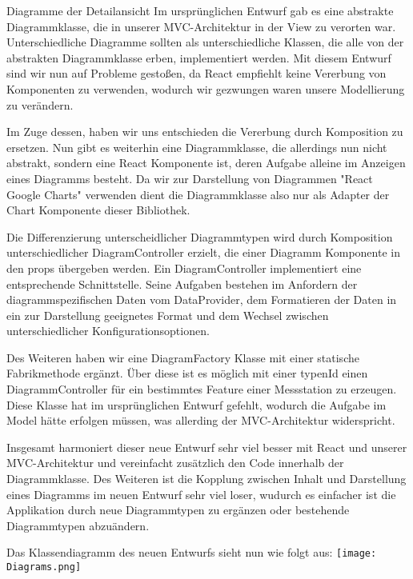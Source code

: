 \begin{Change}{Diagramme der Detailansicht}
    Im ursprünglichen Entwurf gab es eine abstrakte Diagrammklasse, die in unserer MVC-Architektur in der View zu verorten war. Unterschiedliche Diagramme sollten als unterschiedliche Klassen, die alle von der abstrakten Diagrammklasse erben, implementiert werden.
    Mit diesem Entwurf sind wir nun auf Probleme gestoßen, da React empfiehlt keine Vererbung von Komponenten zu verwenden, wodurch wir gezwungen waren unsere Modellierung zu verändern.

    Im Zuge dessen, haben wir uns entschieden die Vererbung durch Komposition zu ersetzen. Nun gibt es weiterhin eine Diagrammklasse, die allerdings nun nicht abstrakt, sondern eine React Komponente ist, deren Aufgabe alleine im Anzeigen eines Diagramms besteht. Da wir zur Darstellung von Diagrammen "React Google Charts" verwenden dient die Diagrammklasse also nur als Adapter der Chart Komponente dieser Bibliothek.

    Die Differenzierung unterscheidlicher Diagrammtypen wird durch Komposition unterschiedlicher DiagramController erzielt, die einer Diagramm Komponente in den props übergeben werden. Ein DiagramController implementiert eine entsprechende Schnittstelle. Seine Aufgaben bestehen im Anfordern der diagrammspezifischen Daten vom DataProvider, dem Formatieren der Daten in ein zur Darstellung geeignetes Format und dem Wechsel zwischen unterschiedlicher Konfigurationsoptionen.

    Des Weiteren haben wir eine DiagramFactory Klasse mit einer statische Fabrikmethode ergänzt. Über diese ist es möglich mit einer typenId einen DiagrammController für ein bestimmtes Feature einer Messstation zu erzeugen. Diese Klasse hat im ursprünglichen Entwurf gefehlt, wodurch die Aufgabe im Model hätte erfolgen müssen, was allerding der MVC-Architektur widerspricht.

    Insgesamt harmoniert dieser neue Entwurf sehr viel besser mit React und unserer MVC-Architektur und vereinfacht zusätzlich den Code innerhalb der Diagrammklasse. Des Weiteren ist die Kopplung zwischen Inhalt und Darstellung eines Diagramms im neuen Entwurf sehr viel loser, wudurch es einfacher ist die Applikation durch neue Diagrammtypen zu ergänzen oder bestehende Diagrammtypen abzuändern.
    
    Das Klassendiagramm des neuen Entwurfs sieht nun wie folgt aus:
     \bigskip
    \texttt{[image: Diagrams.png]}\par\vspace{1cm}
    
\end{Change}


